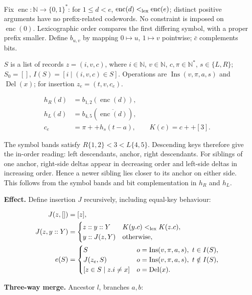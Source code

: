 Fix $\operatorname{enc}:\mathbb N\to\{0,1\}^*$: for $1\le d<e$, $\operatorname{enc}(d)<_{\rm lex}\operatorname{enc}(e)$; distinct positive arguments have no prefix-related codewords. No constraint is imposed on $\operatorname{enc}(0)$. Lexicographic order compares the first differing symbol, with a proper prefix smaller. Define $b_{u,v}$ by mapping $0\mapsto u$, $1\mapsto v$ pointwise; $\bar c$ complements bits.

$S$ is a list of records $z=(i,v,c)$, where $i\in\mathbb N$, $v\in\mathbb N$, $c,\pi\in\mathbb N^*$, $s\in\{L,R\}$; $S_0=[]$, $I(S)=[i\mid(i,v,c)\in S]$. Operations are $\operatorname{Ins}(v,\pi,a,s)$ and $\operatorname{Del}(x)$; for insertion $z_e=(t,v,c_e)$.

\[
\begin{aligned}h_R(d)&=b_{1,2}(\operatorname{enc}(d)),\\h_L(d)&=b_{4,5}(\overline{\operatorname{enc}(d)}),\\c_e&=\pi++h_s(t-a),\qquad K(c)=c++[3].\end{aligned}
\]

The symbol bands satisfy $R\{1,2\}<3<L\{4,5\}$. Descending keys
therefore give the in-order reading: left descendants, anchor, right
descendants. For siblings of one anchor, right-side deltas appear in decreasing order
and left-side deltas in increasing order. Hence a newer sibling lies
closer to its anchor on either side. This follows from the symbol bands
and bit complementation in $h_R$ and $h_L$.


\textbf{Effect.} Define insertion $J$ recursively, including equal-key behaviour:

\[
\begin{aligned}J(z,[])&=[z],\\J(z,y::Y)&=\begin{cases}z::y::Y&K(y.c)<_{\rm lex}K(z.c),\\y::J(z,Y)&\text{otherwise},\end{cases}\\e(S)&=\begin{cases}S&o=\operatorname{Ins}(v,\pi,a,s),\ t\in I(S),\\J(z_e,S)&o=\operatorname{Ins}(v,\pi,a,s),\ t\notin I(S),\\{}[z\in S\mid z.i\ne x]&o=\operatorname{Del}(x).\end{cases}\end{aligned}
\]


\textbf{Three-way merge.} Ancestor $l$, branches $a,b$:

